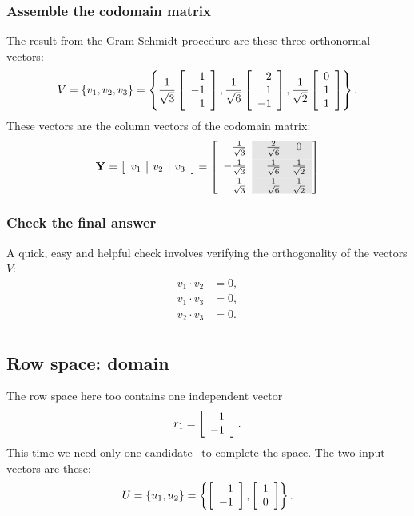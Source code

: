 \subsubsection{Assemble the codomain matrix}
The result from the Gram-Schmidt procedure are these three orthonormal vectors:
\begin{equation}
  V = \lst{v_{1},v_{2},v_{3}} = \lst{
  \sthree \mat{r}{1\\-1\\1},
  \ssix   \mat{r}{2\\1\\-1},
  \stwo   \mat{r}{0\\1\\1}
  }.
\end{equation}
These vectors are the column vectors of the codomain matrix:
\begin{equation}
  \Y{} = \mat{c|c|c}{v_{1} & v_{2} & v_{3}} =
\left[
\begin{array}{ r >{\columncolor{ltgray}}r >{\columncolor{ltgray}}c }
  \sthree &  \frac{2}{ \sqrt{6} } & 0  \\[5pt]
 -\sthree &  \ssix & \stwo \\[5pt]
  \sthree & -\ssix & \stwo 
\end{array}
\right] 
\end{equation}

\subsubsection{Check the final answer}
A quick, easy and helpful check involves verifying the orthogonality of the vectors $V$:
\begin{equation}
  \begin{split}
    v_{1}\cdot v_{2} &= 0,\\
    v_{1}\cdot v_{3} &= 0,\\
    v_{2}\cdot v_{3} &= 0.\\
  \end{split}
\end{equation}

\subsection{Row space: domain}
\label{sec:gs:row}
The row space here too contains one independent vector
\begin{equation}
  r_{1} = \mat{r}{1\\-1}.
\end{equation}
This time we need only one candidate \vv \ to complete the space. The two input vectors are these:
\begin{equation}
  U = \lst{u_{1},u_{2}} = \lst{
  \mat{r}{1\\-1},
  \mat{r}{1\\0}
  }.
\end{equation}

